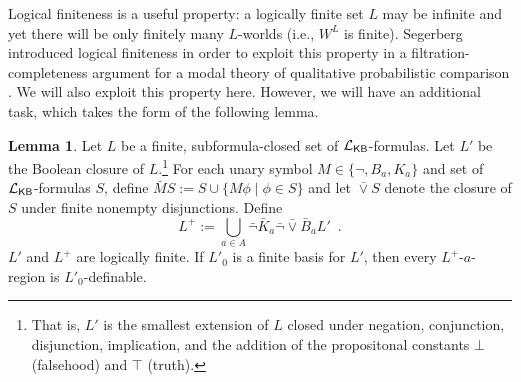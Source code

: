\documentclass[12pt]{article}
\theoremstyle{definition}
\newtheorem{lemma}[theorem]{Lemma}
\newcommand{\Lang}{{\cal L}}   %
\newcommand{\KB}{{\mathsf{KB}}}                        %
\begin{document}
Logical finiteness is a useful property: a logically finite set $L$
may be infinite and yet there will be only finitely many $L$-worlds (i.e.,
$W^L$ is finite).  Segerberg
introduced logical finiteness in order to exploit
this property in a filtration-completeness argument for a modal theory
of qualitative probabilistic comparison \cite{Segerberg1971:qpiams}.  We will
also exploit this property here.  However, we will have an additional task,
which takes the form of the following lemma.

\begin{lemma}
  \label{lemma:definability}
  Let $L$ be a finite, subformula-closed set of $\Lang_\KB$-formulas.
  Let $L'$ be the Boolean closure of $L$.\footnote{That is, $L'$ is
    the smallest extension of $L$ closed under negation, conjunction,
    disjunction, implication, and the addition of the propositonal
    constants $\bot$ (falsehood) and $\top$ (truth).}  For each unary
  symbol $M\in\{\lnot,B_a,K_a\}$ and set of $\Lang_\KB$-formulas $S$,
  define $\bar MS:=S\cup\{M\phi\mid\phi\in S\}$ and let ${\bar\vee} S$
  denote the closure of $S$ under finite nonempty disjunctions.
  Define
  \[
  \textstyle
  L^+ := \bigcup_{a\in A}\bar\lnot\bar K_a \bar\lnot{\bar\vee}\bar B_a L'
  \enspace.
  \]
  $L'$ and $L^+$ are logically finite.  If $L'_0$ is a finite basis for $L'$,
  then every $L^+$-$a$-region is $L'_0$-definable.
\end{lemma}
\end{document}
